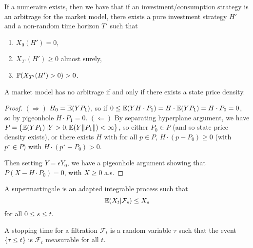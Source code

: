 \begin{thm}
  \label{sec:arbitrage-theory-6}
  If a numeraire exists, then we have that if an
  investment/consumption strategy is an arbitrage for the market
  model, there exists a pure investment strategy $H'$ and a non-random
  time horizon $T'$ such that
  \begin{enumerate}
  \item $X_{0}(H') = 0$,
  \item $X_{T'}(H') \geq 0$ almost surely,
  \item $\Prob{X_{T'}(H') > 0} > 0$.
  \end{enumerate}
\end{thm}

\begin{thm}
  \label{sec:arbitrage-theory-7}
  A market model has no arbitrage if and only if there exists a state
  price density.
\end{thm}

\begin{proof}
  $(\Rightarrow)$ $H_{0} = \E{Y P_{1}}$, so if $0 \leq \E{Y H \cdot P_{1}} = H
  \cdot \E{Y P_{1}} = H \cdot P_{0}  = 0$, so by pigeonhole $H \cdot
  P_{1} = 0$.
  $(\Leftarrow)$ By separating hyperplane argument, we have $P = \{
  \E{Y P_{1}} | Y > 0, \E{Y \| P_{1} \|} < \infty \} $, so either
  $P_{0} \in P$ (and so state price density exists), or there exists
  $H$ with for all $p \in P$, $H \cdot (p - P_{0}) \geq 0$ (with
  $p^{\star} \in P$) with $H \cdot (p^{\star} - P_{0}) > 0$.

  Then setting $Y = \epsilon Y_{0}$, we have a pigeonhole argument
  showing that $P(X - H \cdot P_{0}) = 0$, with $X \geq 0$ a.s.
\end{proof}

\begin{defn}
  \label{sec:arbitrage-theory-14}
  A supermartingale is an adapted integrable process such that
  \begin{equation}
    \label{eq:3}
    \E{X_{t} | \mathcal{F}_{s}} \leq X_{s}
  \end{equation} for all $0 \leq s \leq t$.
\end{defn}

\begin{defn}
  \label{sec:arbitrage-theory-8}
  A stopping time for a filtration $\mathcal{F}_{t}$ is a random
  variable $\tau$  such that the event $\{ \tau \leq t \}$ is
  $\mathcal{F}_{t}$ measurable for all $t$.
\end{defn}

